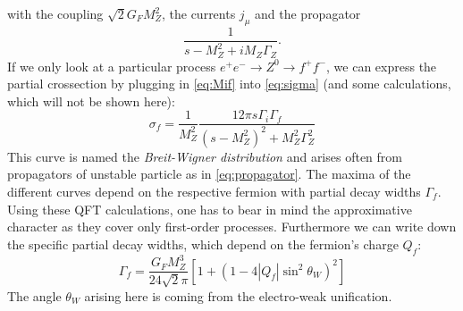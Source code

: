 with the coupling $\sqrt{2} G_F M_Z^2$, the currents $j_\mu$ and the propagator
\begin{equation}
\frac{1}{s - M_Z^2 + iM_Z \Gamma_Z}.
\label{eq:propagator}
\end{equation}
If we only look at a particular process $e^{+}e^- \rightarrow Z^0 \rightarrow f^+ f^-$, we can express the partial crossection
by plugging in \eqref{eq:Mif} into  \eqref{eq:sigma} (and some calculations, which will not be shown here):
\begin{equation}
    \label{eq:breitwigner}
    \sigma_f = \frac{1}{M_Z^2} \frac{12\pi s \Gamma_i \Gamma_f }{(s- M_Z^2)^2 + M_Z^2 \Gamma_Z^2}
\end{equation}
This curve is named the \textit{Breit-Wigner distribution} and arises often from propagators of unstable particle as in 
\eqref{eq:propagator}. The maxima of the different curves depend on the respective fermion with 
partial decay widths $\Gamma_f$. Using these QFT calculations, one has to bear in mind the approximative character as they 
cover only first-order processes. Furthermore we can write down
the specific partial decay widths, which depend on the fermion's charge $Q_f$:
\begin{equation}
    \label{eq:gamma_f}
    \Gamma_f = \frac{G_F M_Z^3}{24 \sqrt{2} \pi} \left[ 1 + (1 - 4 |Q_f| \sin^2 \theta_W )^2 \right]
\end{equation}
The angle $\theta_W$ arising here is coming from the electro-weak unification.
